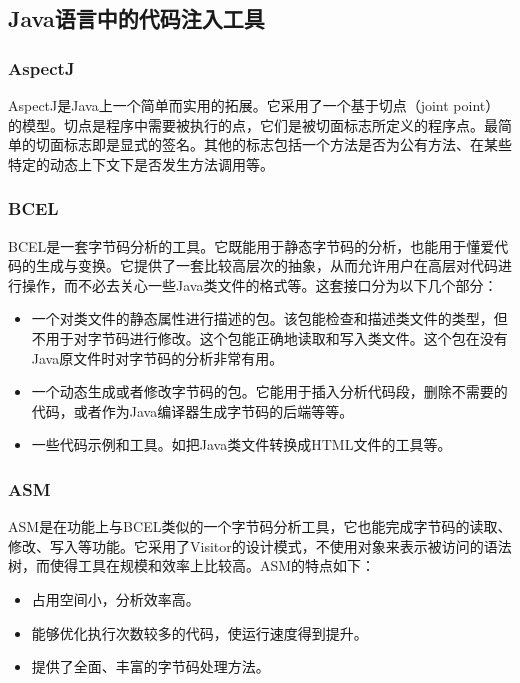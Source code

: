 \subsection{Java语言中的代码注入工具}
\subsubsection{AspectJ}

AspectJ\cite{aspectJ}是Java上一个简单而实用的拓展。它采用了一个基于切点（joint point）的模型。切点是程序中需要被执行的点，它们是被切面标志所定义的程序点。最简单的切面标志即是显式的签名。其他的标志包括一个方法是否为公有方法、在某些特定的动态上下文下是否发生方法调用等。

\subsubsection{BCEL}

BCEL\cite{bcel}是一套字节码分析的工具。它既能用于静态字节码的分析，也能用于懂爱代码的生成与变换。它提供了一套比较高层次的抽象，从而允许用户在高层对代码进行操作，而不必去关心一些Java类文件的格式等。这套接口分为以下几个部分：

\begin{itemize}
	\item 一个对类文件的静态属性进行描述的包。该包能检查和描述类文件的类型，但不用于对字节码进行修改。这个包能正确地读取和写入类文件。这个包在没有Java原文件时对字节码的分析非常有用。
	\item 一个动态生成或者修改字节码的包。它能用于插入分析代码段，删除不需要的代码，或者作为Java编译器生成字节码的后端等等。
	\item 一些代码示例和工具。如把Java类文件转换成HTML文件的工具等。
\end{itemize}

\subsubsection{ASM}

ASM\cite{asm}是在功能上与BCEL类似的一个字节码分析工具，它也能完成字节码的读取、修改、写入等功能。它采用了Visitor的设计模式，不使用对象来表示被访问的语法树，而使得工具在规模和效率上比较高。ASM的特点如下：

\begin{itemize}
	\item 占用空间小，分析效率高。
	\item 能够优化执行次数较多的代码，使运行速度得到提升。
	\item 提供了全面、丰富的字节码处理方法。
\end{itemize}

